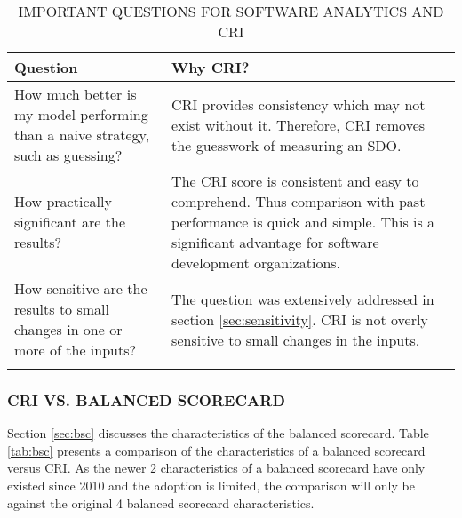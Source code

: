 \documentclass[SDSUThesis.tex]{subfiles}
\begin{document}
            \begin{longtable}{p{4cm}p{10cm}}
                
                \toprule%
                 \centering%
                 {\bfseries Question}
                 & {\bfseries Why CRI?} \\
                
                \cmidrule[0.4pt](r{0.125em}){1-1}%
                \cmidrule[0.4pt](lr{0.125em}){2-2}%
                \endhead
                
                How much better is my model performing than a naive strategy, such as guessing? & CRI 
                provides consistency which may not exist without it.  Therefore, CRI removes the 
                guesswork of measuring an SDO. \\
                \myrowcolour%
                How practically significant are the results? & The CRI score is consistent
                and easy to comprehend.  Thus comparison with past performance is quick 
                and simple.  This is a significant advantage for software 
                development organizations. \\
                How sensitive are the results to small changes in one or more of the inputs? & 
                The question was extensively addressed in section \ref{sec:sensitivity}. CRI is
                not overly sensitive to small changes in the inputs.\\
                
                \bottomrule
                
                \caption{IMPORTANT QUESTIONS FOR SOFTWARE ANALYTICS AND CRI}
                \label{tab:questions}
            \end{longtable}

        
        \subsubsection{CRI VS. BALANCED SCORECARD}
            Section \ref{sec:bsc} discusses the characteristics of the 
            balanced scorecard.  Table \ref{tab:bsc} presents a
            comparison of the characteristics of a balanced scorecard
            versus CRI.
            As the newer 2 characteristics of a balanced scorecard
            have only existed since 2010 and the adoption is limited,
            the comparison will only be against the original 4 balanced
            scorecard characteristics.
            
\end{document}

